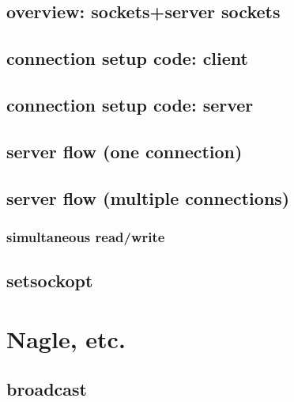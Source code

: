 \subsection{overview: sockets+server sockets}
  

\subsection{connection setup code: client}
 

\subsection{connection setup code: server}
 

\subsection{server flow (one connection)}


\subsection{server flow (multiple connections)}


\subsubsection{simultaneous read/write}


\subsection{setsockopt}


\section{Nagle, etc.}


\subsection{broadcast}


